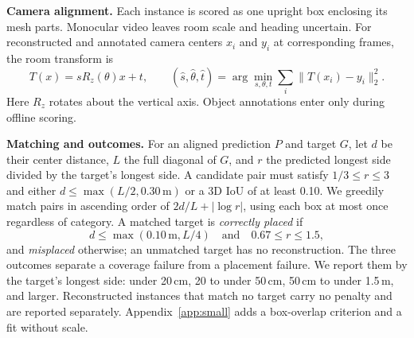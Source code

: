 \textbf{Camera alignment.}
Each instance is scored as one upright box enclosing its mesh parts. Monocular
video leaves room scale and heading uncertain. For reconstructed and annotated
camera centers $x_i$ and $y_i$ at corresponding frames, the room transform is
\begin{equation}
 T(x)=sR_z(\theta)x+t,\qquad
 (\hat{s},\hat{\theta},\hat{t})=
 \arg\min_{s,\theta,t}\sum_i \lVert T(x_i)-y_i\rVert_2^2 .
 \label{eq:camera-alignment}
\end{equation}
Here $R_z$ rotates about the vertical axis. Object annotations enter only
during offline scoring.

\textbf{Matching and outcomes.}
For an aligned prediction $P$ and target $G$, let $d$ be their center distance,
$L$ the full diagonal of $G$, and $r$ the predicted longest side divided by the
target's longest side. A candidate pair must satisfy $1/3\le r\le 3$ and either
$d\le\max(L/2,0.30\,\mathrm{m})$ or a 3D IoU of at least 0.10.
We greedily match pairs in ascending order of $2d/L+|\log r|$, using
each box at most once regardless of category. A
matched target is \emph{correctly placed} if
\begin{equation}
 d\le\max(0.10\,\mathrm{m},L/4)\quad\text{and}\quad 0.67\le r\le 1.5,
 \label{eq:center-size}
\end{equation}
and \emph{misplaced} otherwise; an unmatched target has no reconstruction.
The three outcomes separate a coverage failure from a placement failure. We
report them by the target's longest side: under 20\,cm, 20 to under 50\,cm,
50\,cm to under 1.5\,m, and larger. Reconstructed instances that match no
target carry no penalty and are reported separately.
Appendix~\ref{app:small} adds a box-overlap criterion and a fit without
scale.
